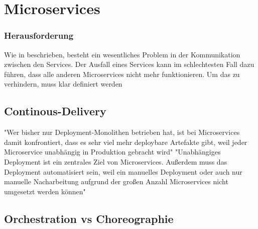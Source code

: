\chapter{Microservices}
\label{chap:Microservices}


\subsection{Herausforderung}
Wie in \cite[S. 25]{EWolff2016:Microservices} beschrieben, besteht ein wesentliches Problem in der Kommunikation zwischen den Services. Der Ausfall eines Services kann im schlechtesten Fall dazu führen, dass alle anderen Microservices nicht mehr funktionieren. Um das zu verhindern, muss klar definiert werden


\section{Continous-Delivery}
\label{sec:ContinousDelivery}
"Wer bisher nur Deployment-Monolithen betrieben hat, ist bei Microservices damit konfrontiert, dass es sehr viel mehr deploybare Artefakte gibt, weil jeder Microservice unabhängig in Produktion gebracht wird"\cite[S. 241]{EWolff2016:Microservices}
"Unabhängiges Deployment ist ein zentrales Ziel von Microservices. Außerdem muss das Deployment automatisiert sein, weil ein manuelles Deployment oder auch nur manuelle Nacharbeitung aufgrund der großen Anzahl Microservices nicht umgesetzt werden können"\cite[S. 256]{EWolff2016:Microservices}

\section{Orchestration vs Choreographie}
\label{sec:orchestrationvschoreographie}

